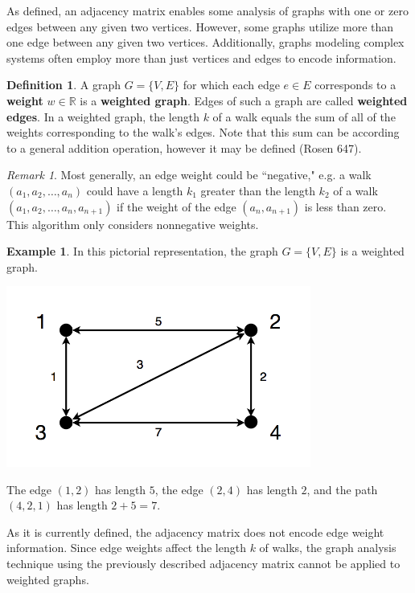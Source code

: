 \documentclass[12pt]{amsart}
\theoremstyle{definition}
\newtheorem{definition}[thm]{Definition}
\newtheorem{example}[thm]{Example}
\theoremstyle{remark}
\newtheorem{remark}[thm]{Remark}
\numberwithin{equation}{section}
\newcommand{\R}{\mathbb{R}}
\begin{document}
As defined, an adjacency matrix enables some analysis of graphs with one or zero edges between any given two vertices. However, some graphs utilize more than one edge between any given two vertices. Additionally, graphs modeling complex systems often employ more than just vertices and edges to encode information.

\begin{definition}
A graph $G = \{V,E\}$ for which each edge $e \in E$ corresponds to a \textbf{weight} $w \in \R$ is a \textbf{weighted graph}. Edges of such a graph are called \textbf{weighted edges}. In a weighted graph, the length $k$ of a walk equals the sum of all of the weights corresponding to the walk's edges. Note that this sum can be according to a general addition operation, however it may be defined (Rosen 647).
\end{definition}

\begin{remark}
Most generally, an edge weight could be ``negative," e.g. a walk $(a_1,a_2, \ldots, a_n)$ could have a length $k_1$ greater than the length $k_2$ of a walk $(a_1,a_2, \ldots, a_n, a_{n+1})$ if the weight of the edge $(a_n, a_{n+1})$ is less than zero. This algorithm only considers nonnegative weights.
\end{remark}

\begin{example}
In this pictorial representation, the graph $G = \{V,E\}$ is a weighted graph.

\begin{center}\includegraphics[width=10cm]{figure-3.png}\end{center}

The edge $(1,2)$ has length $5$, the edge $(2,4)$ has length $2$, and the path $(4,2,1)$ has length $2+5 = 7$.
\end{example}

As it is currently defined, the adjacency matrix does not encode edge weight information. Since edge weights affect the length $k$ of walks, the graph analysis technique using the previously described adjacency matrix cannot be applied to weighted graphs.
\end{document}
